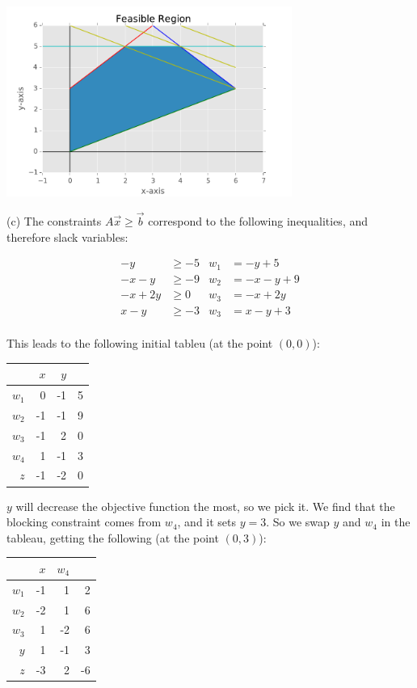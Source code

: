 \documentclass[fleqn]{homework}
\begin{document}
\begin{problem}{5}
    \begin{center}
      \includegraphics[width=0.7\textwidth]{feasibleb.pdf}
    \end{center}

    (c) The constraints $A \vec{x} \geq \vec{b}$ correspond to the following
    inequalities, and therefore slack variables:

    \begin{align*}
      -y &\geq -5 & w_1 &= -y + 5\\
      -x - y &\geq -9 & w_2 &= -x - y + 9 \\
      -x + 2y &\geq 0 & w_3 &= -x + 2y \\
      x - y &\geq -3 & w_3 &= x - y + 3 \\
    \end{align*}

    This leads to the following initial tableu (at the point $(0,0)$):

    \begin{tabular}{r|rrr}
      & $x$ & $y$ & \\
      \hline
      $w_1$ &  0 & -1 &  5 \\
      $w_2$ & -1 & -1 &  9 \\
      $w_3$ & -1 &  2 &  0 \\
      $w_4$ &  1 & -1 &  3 \\
      $z$   & -1 & -2 &  0 \\
    \end{tabular}

    $y$ will decrease the objective function the most, so we pick it.  We find
    that the blocking constraint comes from $w_4$, and it sets $y=3$.  So we
    swap $y$ and $w_4$ in the tableau, getting the following (at the point
    $(0, 3)$):

    \begin{tabular}{r|rrr}
      & $x$ & $w_4$ & \\
      \hline
      $w_1$ & -1 &  1 &  2 \\
      $w_2$ & -2 &  1 &  6 \\
      $w_3$ &  1 & -2 &  6 \\
      $y$   &  1 & -1 &  3 \\
      $z$   & -3 &  2 & -6 \\
    \end{tabular}


\end{problem}
\end{document}
